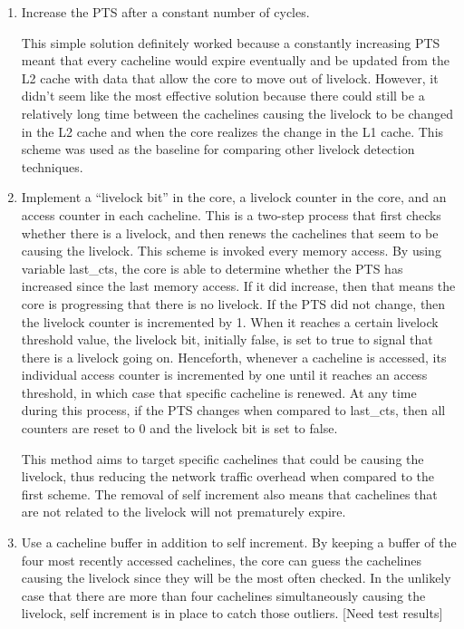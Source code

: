 \documentclass[12pt]{article}
\begin{document}
\begin{enumerate}
	\item       Increase the PTS after a constant number of cycles.
	
	This simple solution definitely worked because a constantly increasing PTS meant that every cacheline would expire eventually and be updated from the L2 cache with data that allow the core to move out of livelock. However, it didn’t seem like the most effective solution because there could still be a relatively long time between the cachelines causing the livelock to be changed in the L2 cache and when the core realizes the change in the L1 cache. This scheme was used as the baseline for comparing other livelock detection techniques.
	
	
	
	
	\item        Implement a “livelock bit” in the core, a livelock counter in the core, and an access counter in each cacheline. This is a two-step process that first checks whether there is a livelock, and then renews the cachelines that seem to be causing the livelock. This scheme is invoked every memory access. By using variable last\_cts, the core is able to determine whether the PTS has increased since the last memory access. If it did increase, then that means the core is progressing that there is no livelock. If the PTS did not change, then the livelock counter is incremented by 1. When it reaches a certain livelock threshold value, the livelock bit, initially false, is set to true to signal that there is a livelock going on. Henceforth, whenever a cacheline is accessed, its individual access counter is incremented by one until it reaches an access threshold, in which case that specific cacheline is renewed. At any time during this process, if the PTS changes when compared to last\_cts, then all counters are reset to 0 and the livelock bit is set to false.
	
	
	This method aims to target specific cachelines that could be causing the livelock, thus reducing the network traffic overhead when compared to the first scheme. The removal of self increment also means that cachelines that are not related to the livelock will not prematurely expire.
	
	\item       Use a cacheline buffer in addition to self increment. By keeping a buffer of the four most recently accessed cachelines, the core can guess the cachelines causing the livelock since they will be the most often checked. In the unlikely case that there are more than four cachelines simultaneously causing the livelock, self increment is in place to catch those outliers.
	[Need test results]
\end{enumerate}
\end{document}
